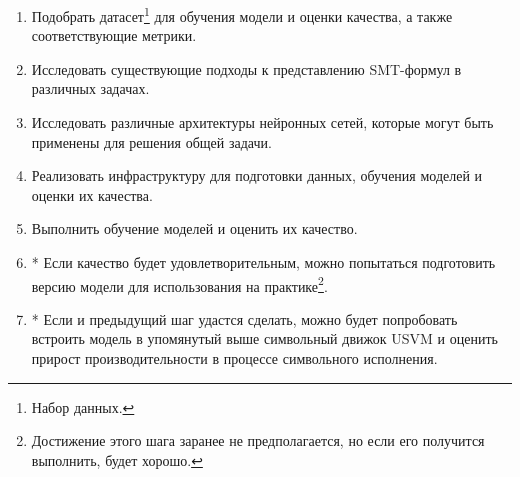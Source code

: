 \begin{enumerate}
    \item Подобрать датасет\footnote{Набор данных.} для обучения модели и оценки качества, а также соответствующие метрики.
    \item Исследовать существующие подходы к представлению SMT-формул в различных задачах.
    \item Исследовать различные архитектуры нейронных сетей, которые могут быть применены для решения общей задачи.
    \item Реализовать инфраструктуру для подготовки данных, обучения моделей и оценки их качества.
    \item Выполнить обучение моделей и оценить их качество.
    \item * Если качество будет удовлетворительным, можно попытаться подготовить версию модели для использования на практике\footnote{Достижение этого шага заранее не предполагается, но если его получится выполнить, будет хорошо.}.
    \item * Если и предыдущий шаг удастся сделать, можно будет попробовать встроить модель в упомянутый выше символьный движок USVM \cite{usvm-diploma} и оценить прирост производительности в процессе символьного исполнения.
\end{enumerate}
